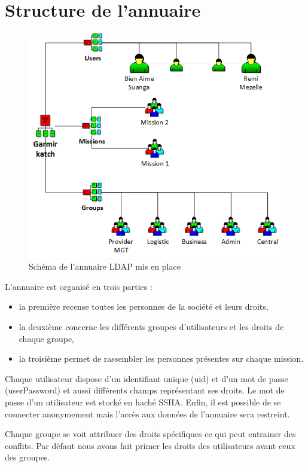 \documentclass[11pt,fleqn]{report}
\begin{document}
\chapter{Structure de l'annuaire}
\begin{figure}[htbp]
	\centering
	\includegraphics[scale=0.9]{Images/SchemaLDAP.png}
	\caption{Schéma de l'annuaire LDAP mis en place}
	\label{SchemaLDAP}
\end{figure}
L’annuaire est organisé en trois parties :
\begin{itemize}
\item la première recense toutes les personnes de la société et leurs droits,
\item la deuxième concerne les différents groupes d’utilisateurs et les droits de chaque groupe,
\item la troisième permet de rassembler les personnes présentes sur chaque mission.
\end{itemize}

Chaque utilisateur dispose d’un identifiant unique (uid) et d’un mot de passe (userPassword) et aussi différents champs représentant ses droits. Le mot de passe d’un utilisateur est stocké en haché SSHA. Enfin, il est possible de se connecter anonymement mais l’accès aux données de l’annuaire sera restreint.

Chaque groupe se voit attribuer des droits spécifiques ce qui peut entrainer des conflits. Par défaut nous avons fait primer les droits des utilisateurs avant ceux des groupes.
\end{document}
